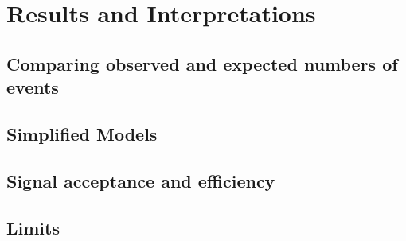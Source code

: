 \chapter{Results and Interpretations}
\label{chap:Results}

\section{Comparing observed and expected numbers of events}
\label{sec:fullCount}

\section{Simplified Models}
\label{sec:SimplifiedModels}

\section{Signal acceptance and efficiency}

\section{Limits}
